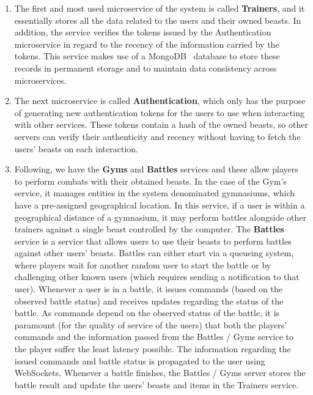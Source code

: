 \begin{enumerate}
    \item The first and most used microservice of the system is called \textbf{Trainers}, and it essentially stores all the data related to the users and their owned beasts. In addition, the service verifies the tokens issued by the Authentication microservice in regard to the recency of the information carried by the tokens. This service makes use of a MongoDB~\cite{mongodb} database to store these records in permanent storage and to maintain data consistency across microservices.
    
    \item The next microservice is called \textbf{Authentication}, which only has the purpose of generating new authentication tokens for the users to use when interacting with other services. These tokens contain a hash of the owned beasts, so other servers can verify their authenticity and recency without having to fetch the users' beasts on each interaction.

    \item Following, we have the \textbf{Gyms} and \textbf{Battles} services and these allow players to perform combats with their obtained beasts. In the case of the Gym's service, it manages entities in the system denominated gymnasiums, which have a pre-assigned geographical location. In this service, if a user is within a geographical distance of a gymnasium, it may perform battles alongside other trainers against a single beast controlled by the computer. The \textbf{Battles} service is a service that allows users to use their beasts to perform battles against other users' beasts. Battles can either start via a queueing system, where players wait for another random user to start the battle or by challenging other known users (which requires sending a notification to that user). Whenever a user is in a battle, it issues commands (based on the observed battle status) and receives updates regarding the status of the battle. As commands depend on the observed status of the battle, it is paramount (for the quality of service of the users) that both the players' commands and the information passed from the Battles / Gyms service to the player suffer the least latency possible. The information regarding the issued commands and battle status is propagated to the user using WebSockets. Whenever a battle finishes, the Battles / Gyms server stores the battle result and update the users' beasts and items in the Trainers service.
    

\end{enumerate}
